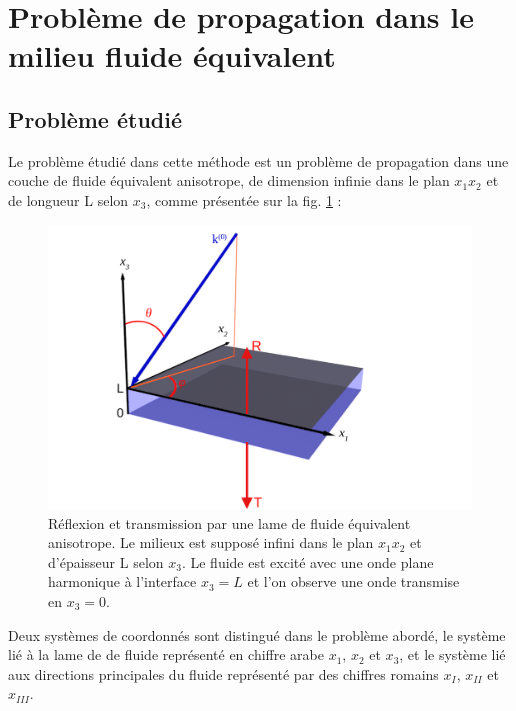 \documentclass[twoside,openright]{report}
\begin{document}
\section{Problème de propagation dans le milieu fluide équivalent}
\label{Ch_Prop_S_Pb}
\subsection{Problème étudié}
\label{Ch_Prop_S_Pb_SS_Pb}
    Le problème étudié dans cette méthode est un problème de propagation dans une couche de fluide équivalent anisotrope, de dimension infinie dans le plan $x_1x_2$ et de longueur L selon $x_3$, comme présentée sur la fig. \ref{Schema} :
    \begin{figure}[ht!]
    \centering
    \includegraphics[scale=1]{Fig3D.pdf}
    \caption{Réflexion et transmission par une lame de fluide équivalent anisotrope. Le milieux est supposé infini dans le plan $x_1x_2$ et d'épaisseur L selon $x_3$. Le fluide est excité avec une onde plane harmonique à l'interface $x_3=L$ et l'on observe une onde transmise en $x_3=0$. }
    \label{Schema}
    \end{figure}
    
    Deux systèmes de coordonnés sont distingué dans le problème abordé, le système lié à la lame de de fluide représenté en chiffre arabe $x_1$, $x_2$ et $x_3$, et le système lié aux directions principales du fluide représenté par des chiffres romains $x_I$, $x_{II}$ et $x_{III}$.  
    
\end{document}
